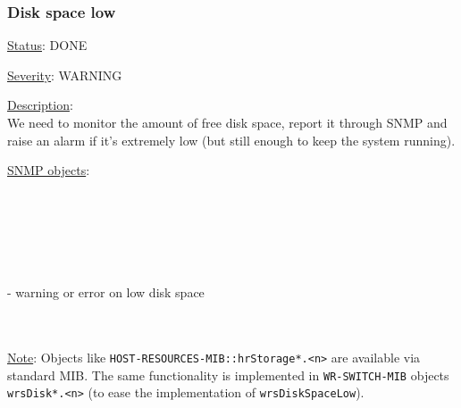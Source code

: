 \subsubsection{\bf Disk space low}
		\label{fail:other:no_disk}
		\begin{packed_enum}
			\item [] \underline{Status}: DONE
			\item [] \underline{Severity}: WARNING
			\item [] \underline{Description}:\\
				We need to monitor the amount of free disk space, report it through SNMP
				and raise an alarm if it's extremely low (but still enough to keep the
				system running).
			\item [] \underline{SNMP objects}:\\
				\\
				\\
				\\
				\\
				\\
				\\
				 - warning or error on low disk space\\
				\\
				\\
			\item [] \underline{Note}:
				Objects like \texttt{HOST-RESOURCES-MIB::hrStorage*.<n>} are available
				via standard MIB. The same functionality is implemented in
				\texttt{WR-SWITCH-MIB} objects \texttt{wrsDisk*.<n>} (to ease the
				implementation of \texttt{wrsDiskSpaceLow}).
		\end{packed_enum}

